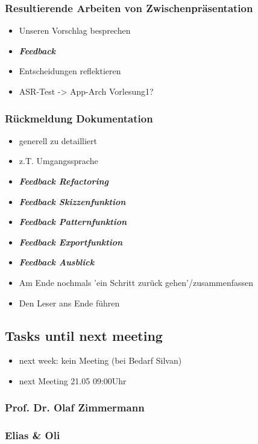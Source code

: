 \hypertarget{resultierende-arbeiten-von-zwischenpruxe4sentation}{%
\subsubsection*{Resultierende Arbeiten von
Zwischenpräsentation}\label{resultierende-arbeiten-von-zwischenpruxe4sentation}}

\begin{itemize}
\item Unseren Vorschlag besprechen 
\item \emph{\textbf{Feedback}}
\item Entscheidungen reflektieren
\item ASR-Test -\textgreater{} App-Arch Vorlesung1?
\end{itemize}

\hypertarget{ruxfcckmeldung-dokumentation}{%
\subsubsection*{Rückmeldung
Dokumentation}\label{ruxfcckmeldung-dokumentation}}

\begin{itemize}
\item generell zu detailliert
\item z.T. Umgangssprache 
\item \emph{\textbf{Feedback Refactoring}}
\item \emph{\textbf{Feedback Skizzenfunktion}}
\item \emph{\textbf{Feedback Patternfunktion}}
\item \emph{\textbf{Feedback Exportfunktion}}
\item \emph{\textbf{Feedback Ausblick}}
\item Am Ende nochmals 'ein Schritt zurück gehen'/zusammenfassen
\item Den Leser ans Ende führen
\end{itemize}

\hypertarget{tasks-until-next-meeting}{%
\subsection*{Tasks until next meeting}\label{tasks-until-next-meeting}}

\begin{itemize}
\item next week: kein Meeting (bei Bedarf Silvan)
\item next Meeting 21.05 09:00Uhr
\end{itemize}

\hypertarget{prof-dr-olaf-zimmermann}{%
\subsubsection*{Prof. Dr. Olaf
Zimmermann}\label{prof-dr-olaf-zimmermann}}

\hypertarget{elias--oli}{%
\subsubsection*{Elias \& Oli}\label{elias--oli}}